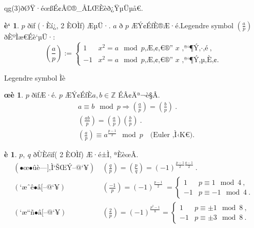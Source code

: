 \documentclass{jsarticle}
\theoremstyle{definition}
\newtheorem*{theorem*}{è}
\newtheorem*{definition*}{è`}
\newtheorem*{proposition*}{œè}
\begin{document}
qg(3)ðØŸ·éœßÉ¢­Â©®_ÅLŒÈèð¿ŸµÜµå€.
\begin{center}
\end{center}
\begin{definition*}
 $p$ ðïf (·Èí¿, 2 ÈOÌf) ÆµÜ·.
$a$ ð $p$ ÆÝ¢ÉfÈ®Æ·é.Legendre symbol $ \left(\frac{a}{p}\right)$ ðÈºÌæ€Éè`µÜ·:
\[
\left(\frac{a}{p}\right)
:=\begin{cases}
1 & x^2=a \mod p  \text{Æ¢€® $x$ ª¶Ý·é}\ ,
\\
-1 & x^2=a \mod p  \text{Æ¢€® $x$ ª¶ÝµÈ¢}.
\end{cases}
\]
\end{definition*}
\begin{itembox}[|]{Legendre symbol Ìè}
\begin{proposition*}
 $p$ ðïfÆ·é. $p$ ÆÝ¢ÉfÈ$a,b\in \mathbb{Z}$ ÉÂ¢Äª¬è§Â.
\begin{align*}
& a\equiv b \mod p \Longrightarrow \left(\frac{a}{p}\right)= \left(\frac{b}{p}\right)\ .
\\
& \left(\frac{ab}{p}\right)= \left(\frac{a}{p}\right) \left(\frac{b}{p}\right)\ .
\\
&\left(\frac{a}{p}\right)\equiv a^{\frac{p-1}{2}} \mod p\quad \text{(Euler ÌK)}.
\end{align*}
\end{proposition*}
\begin{theorem*}
$p,\ q$ ðÙÈéïf( 2 ÈOÌf) Æ·é±Ì, ªÈèœÂ.
\begin{align*}
(œûè]ÌÝ@¥)\ &\left(\frac{q}{p}\right)=\left(\frac{p}{q}\right)=(-1)^{\frac{p-1}{2}\frac{q-1}{2}}\ .
\\
(æêâ[@¥)\ &\left(\frac{-1}{p}\right)=(-1)^{\frac{p-1}{2}}\
=
\begin{cases}
1  & p\equiv 1\mod 4\ ,
\\
-1 & p\equiv -1\mod 4\ .
\end{cases}
\\
(æñâ[@¥)\ &\left(\frac{2}{p}\right)=(-1)^{\frac{p^2-1}{8}}
=
\begin{cases}
1  & p\equiv \pm 1\mod 8\ ,
\\
-1 & p\equiv \pm 3\mod 8\ .
\end{cases}
\end{align*}
\end{theorem*}
\end{itembox}
\end{document}
